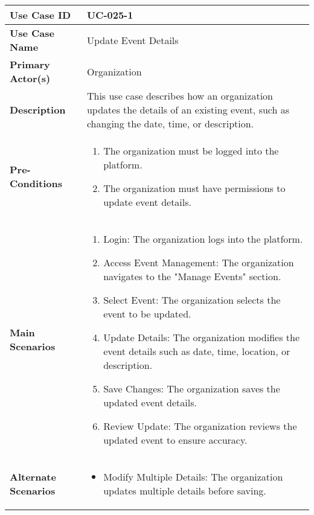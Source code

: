 \begin{table}[!ht]
    \centering
    \renewcommand{\arraystretch}{1.3} %
    \begin{tabularx}{\textwidth}{|l|X|}
        \hline
        \textbf{Use Case ID} & UC-025-1 \\
        \hline
        \textbf{Use Case Name} & Update Event Details \\
        \hline
        \textbf{Primary Actor(s)} & Organization \\
        \hline
        \textbf{Description} & This use case describes how an organization updates the details of an existing event, such as changing the date, time, or description. \\
        \hline
        \textbf{Pre-Conditions} & 
        \begin{enumerate}[label=\arabic*.,itemsep=0pt]
            \item The organization must be logged into the platform.
            \item The organization must have permissions to update event details.
        \end{enumerate} \\
        \hline
        \textbf{Main Scenarios} & 
        \begin{enumerate}[label=\arabic*.,itemsep=0pt]
            \item Login: The organization logs into the platform.
            \item Access Event Management: The organization navigates to the "Manage Events" section.
            \item Select Event: The organization selects the event to be updated.
            \item Update Details: The organization modifies the event details such as date, time, location, or description.
            \item Save Changes: The organization saves the updated event details.
            \item Review Update: The organization reviews the updated event to ensure accuracy.
        \end{enumerate} \\
        \hline
        \textbf{Alternate Scenarios} & 
        \begin{itemize}[label=--,itemsep=0pt]
            \item Modify Multiple Details: The organization updates multiple details before saving.
        \end{itemize} \\

\end{tabularx}
\end{table}
